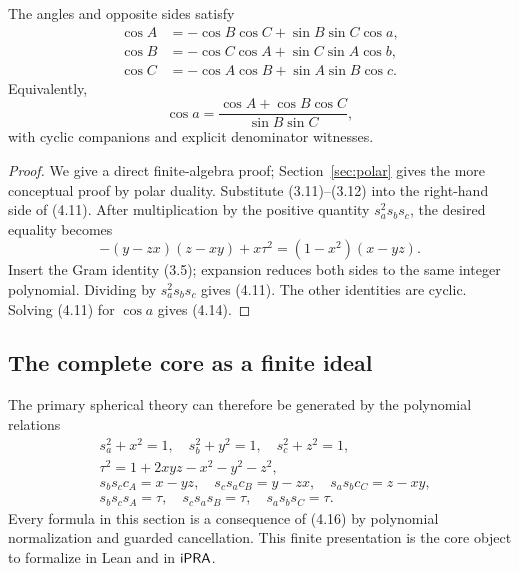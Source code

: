 \begin{theorem}
\label{thm:angle-cosine}
The angles and opposite sides satisfy
\begin{align}
 \cos A&=-\cos B\cos C+\sin B\sin C\cos a,                \tag{4.11}\\
 \cos B&=-\cos C\cos A+\sin C\sin A\cos b,                \tag{4.12}\\
 \cos C&=-\cos A\cos B+\sin A\sin B\cos c.                \tag{4.13}
\end{align}
Equivalently,
\begin{equation}
 \cos a=\frac{\cos A+\cos B\cos C}{\sin B\sin C},        \tag{4.14}
\end{equation}
with cyclic companions and explicit denominator witnesses.
\end{theorem}

\begin{proof}
We give a direct finite-algebra proof; Section~\ref{sec:polar} gives the more
conceptual proof by polar duality.  Substitute (3.11)--(3.12) into the
right-hand side of (4.11).  After multiplication by the positive quantity
\(s_a^2s_bs_c\), the desired equality becomes
\begin{equation}
 -(y-zx)(z-xy)+x\tau^2=(1-x^2)(x-yz).                      \tag{4.15}
\end{equation}
Insert the Gram identity (3.5); expansion reduces both sides to the same
integer polynomial.  Dividing by \(s_a^2s_bs_c\) gives (4.11).  The other
identities are cyclic.  Solving (4.11) for \(\cos a\) gives (4.14).
\end{proof}

\subsection{The complete core as a finite ideal}

The primary spherical theory can therefore be generated by the polynomial
relations
\begin{align*}
&s_a^2+x^2=1,\quad s_b^2+y^2=1,\quad s_c^2+z^2=1,\\
&\tau^2=1+2xyz-x^2-y^2-z^2,\\
&s_bs_c c_A=x-yz,\quad s_cs_a c_B=y-zx,\quad
 s_as_b c_C=z-xy,\\
&s_bs_c s_A=\tau,\quad s_cs_a s_B=\tau,\quad
 s_as_b s_C=\tau.                                          \tag{4.16}
\end{align*}
Every formula in this section is a consequence of (4.16) by polynomial
normalization and guarded cancellation.  This finite presentation is the core
object to formalize in Lean and in \(\mathsf{iPRA}\).
